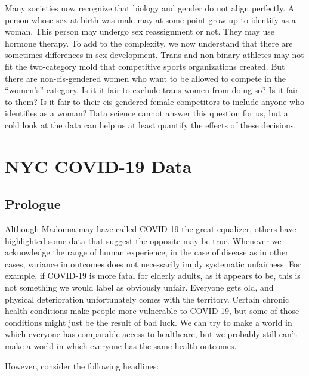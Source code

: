 \documentclass[openany]{book}
\begin{document}
Many societies now recognize that biology and gender do not align perfectly. A person whose sex at birth was male may at some point grow up to identify as a woman. This person may undergo sex reassignment or not. They may use hormone therapy. To add to the complexity, we now understand that there are sometimes differences in sex development. Trans and non-binary athletes may not fit the two-category mold that competitive sports organizations created. But there are non-cis-gendered women who want to be allowed to compete in the ``women's'' category. Is it it fair to exclude trans women from doing so? Is it fair to them? Is it fair to their cis-gendered female competitors to include anyone who identifies as a woman? Data science cannot answer this question for us, but a cold look at the data can help us at least quantify the effects of these decisions.

\hypertarget{nyc-covid-19-data}{%
\chapter{NYC COVID-19 Data}\label{nyc-covid-19-data}}

\hypertarget{prologue}{%
\section*{Prologue}\label{prologue}}

Although Madonna may have called COVID-19 \href{https://pagesix.com/2020/03/22/madonna-calls-coronavirus-the-great-equalizer-in-bizarre-bathtub-video/}{the great equalizer}, others have highlighted some data that suggest the opposite may be true. Whenever we acknowledge the range of human experience, in the case of disease as in other cases, variance in outcomes does not necessarily imply systematic unfairness. For example, if COVID-19 is more fatal for elderly adults, as it appears to be, this is not something we would label as obviously unfair. Everyone gets old, and physical deterioration unfortunately comes with the territory. Certain chronic health conditions make people more vulnerable to COVID-19, but some of those conditions might just be the result of bad luck. We can try to make a world in which everyone has comparable access to healthcare, but we probably still can't make a world in which everyone has the same health outcomes.

However, consider the following headlines:
\end{document}
